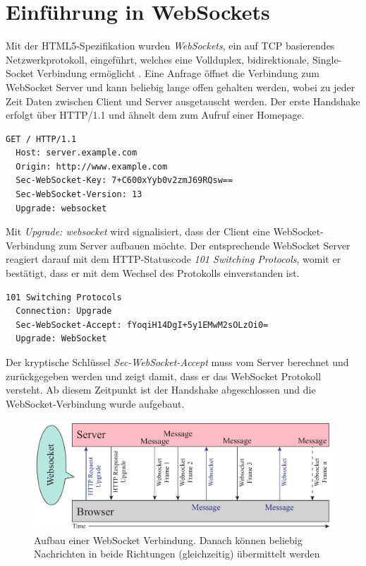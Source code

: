 \section{Einführung in WebSockets}
Mit der HTML5-Spezifikation wurden \emph{WebSockets}, ein auf TCP basierendes Netzwerkprotokoll, eingeführt, welches eine Vollduplex, bidirektionale, Single-Socket Verbindung ermöglicht \cite[S. 7]{ws}. Eine Anfrage öffnet die Verbindung zum WebSocket Server und kann beliebig lange offen gehalten werden, wobei zu jeder Zeit Daten zwischen Client und Server ausgetauscht werden. Der erste Handshake erfolgt über HTTP/1.1 und ähnelt dem zum Aufruf einer Homepage.
\\
\begin{lstlisting}[captionpos=b, caption=HTTP Request vom Client {\cite[S. 6]{rfc6455:handshake}}]
  GET / HTTP/1.1
  Host: server.example.com
  Origin: http://www.example.com
  Sec-WebSocket-Key: 7+C600xYyb0v2zmJ69RQsw==
  Sec-WebSocket-Version: 13
  Upgrade: websocket
\end{lstlisting}

Mit \emph{Upgrade: websocket} wird signalisiert, dass der Client eine WebSocket-Verbindung zum Server aufbauen möchte. Der entsprechende WebSocket Server reagiert darauf mit dem HTTP-Statuscode \emph{101 Switching Protocols}, womit er bestätigt, dass er mit dem Wechsel des Protokolls einverstanden ist.
\\
\begin{lstlisting}[captionpos=b, caption=HTTP Response vom Server {\cite[S. 8]{rfc6455:handshake}}]
  101 Switching Protocols
  Connection: Upgrade
  Sec-WebSocket-Accept: fYoqiH14DgI+5y1EMwM2sOLzOi0=
  Upgrade: WebSocket
\end{lstlisting}

Der kryptische Schlüssel \emph{Sec-WebSocket-Accept} muss vom Server berechnet und zurückgegeben werden und zeigt damit, dass er das WebSocket Protokoll versteht. Ab diesem Zeitpunkt ist der Handshake abgeschlossen und die WebSocket-Verbindung wurde aufgebaut.\par

\begin{figure}[!ht]
	\centering
	\includegraphics[width=15cm]{fig/websockets}
	\caption{Aufbau einer WebSocket Verbindung. Danach können beliebig Nachrichten in beide Richtungen (gleichzeitig) übermittelt werden}
\end{figure}


